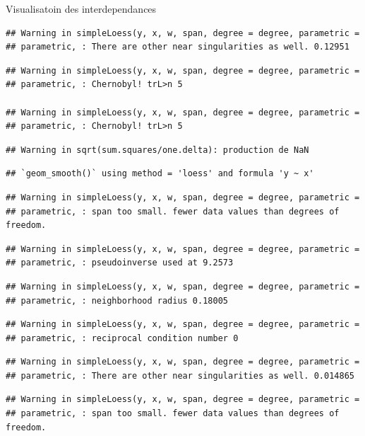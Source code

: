 \documentclass[11pt,ignorenonframetext,]{beamer}
\begin{document}
\begin{frame}[fragile]{Visualisatoin des interdependances}
\begin{verbatim}
## Warning in simpleLoess(y, x, w, span, degree = degree, parametric =
## parametric, : There are other near singularities as well. 0.12951
\end{verbatim}

\begin{verbatim}
## Warning in simpleLoess(y, x, w, span, degree = degree, parametric =
## parametric, : Chernobyl! trL>n 5

## Warning in simpleLoess(y, x, w, span, degree = degree, parametric =
## parametric, : Chernobyl! trL>n 5
\end{verbatim}

\begin{verbatim}
## Warning in sqrt(sum.squares/one.delta): production de NaN
\end{verbatim}

\begin{verbatim}
## `geom_smooth()` using method = 'loess' and formula 'y ~ x'
\end{verbatim}

\begin{verbatim}
## Warning in simpleLoess(y, x, w, span, degree = degree, parametric =
## parametric, : span too small. fewer data values than degrees of freedom.
\end{verbatim}

\begin{verbatim}
## Warning in simpleLoess(y, x, w, span, degree = degree, parametric =
## parametric, : pseudoinverse used at 9.2573
\end{verbatim}

\begin{verbatim}
## Warning in simpleLoess(y, x, w, span, degree = degree, parametric =
## parametric, : neighborhood radius 0.18005
\end{verbatim}

\begin{verbatim}
## Warning in simpleLoess(y, x, w, span, degree = degree, parametric =
## parametric, : reciprocal condition number 0
\end{verbatim}

\begin{verbatim}
## Warning in simpleLoess(y, x, w, span, degree = degree, parametric =
## parametric, : There are other near singularities as well. 0.014865
\end{verbatim}

\begin{verbatim}
## Warning in simpleLoess(y, x, w, span, degree = degree, parametric =
## parametric, : span too small. fewer data values than degrees of freedom.
\end{verbatim}


\end{frame}
\end{document}
